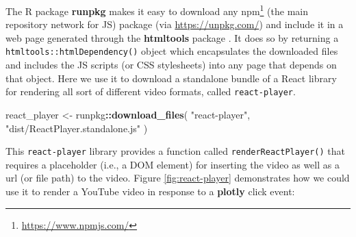\documentclass[
  12pt,
]{krantz}
\newenvironment{Shaded}{\begin{snugshade}}{\end{snugshade}}
\newcommand{\KeywordTok}[1]{\textcolor[rgb]{0.13,0.29,0.53}{\textbf{#1}}}
\newcommand{\NormalTok}[1]{#1}
\newcommand{\OperatorTok}[1]{\textcolor[rgb]{0.81,0.36,0.00}{\textbf{#1}}}
\newcommand{\StringTok}[1]{\textcolor[rgb]{0.31,0.60,0.02}{#1}}
\renewcommand{\href}[2]{#2\footnote{\url{#1}}}
\begin{document}
The R package \textbf{runpkg} makes it easy to download any \href{https://www.npmjs.com/}{npm} (the main repository network for JS) package (via \url{https://unpkg.com/}) and include it in a web page generated through the \textbf{htmltools} package \citep{runpkg}. It does so by returning a \texttt{htmltools::htmlDependency()} object which encapsulates the downloaded files and includes the JS scripts (or CSS stylesheets) into any page that depends on that object. Here we use it to download a standalone bundle of a React library for rendering all sort of different video formats, called \texttt{react-player}.

\begin{Shaded}
\begin{Highlighting}[]
\NormalTok{react_player <-}\StringTok{ }\NormalTok{runpkg}\OperatorTok{::}\KeywordTok{download_files}\NormalTok{(}
  \StringTok{"react-player"}\NormalTok{, }
  \StringTok{"dist/ReactPlayer.standalone.js"}
\NormalTok{)}
\end{Highlighting}
\end{Shaded}

This \texttt{react-player} library provides a function called \texttt{renderReactPlayer()} that requires a placeholder (i.e., a DOM element) for inserting the video as well as a url (or file path) to the video. Figure \ref{fig:react-player} demonstrates how we could use it to render a YouTube video in response to a \textbf{plotly} click event:
\end{document}

